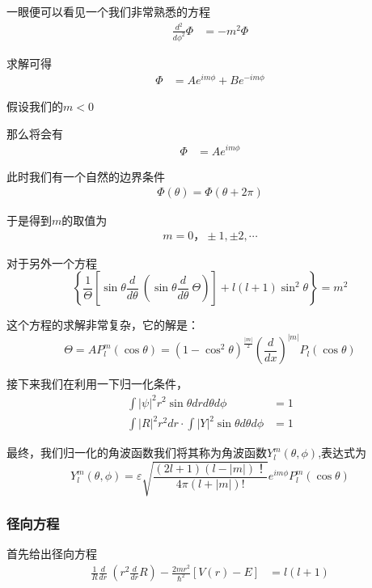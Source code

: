 \documentclass{article}
\newcommand{\D}[2]{\frac{d}{d#2}#1}
\begin{document}
一眼便可以看见一个我们非常熟悉的方程
\begin{align*}
    \frac{d^2}{d\phi^2}\Phi&=-m^2\Phi
\end{align*}

求解可得
\begin{align*}
    \Phi&=Ae^{im\phi}+Be^{-im\phi}
\end{align*}

假设我们的$m<0$

那么将会有
\begin{align*}
    \Phi&=Ae^{im\phi}
\end{align*}

此时我们有一个自然的边界条件
\begin{align*}
    \Phi(\theta)=\Phi(\theta+2\pi)
\end{align*}

于是得到$m$的取值为
\begin{align*}
    m=0，\pm 1,\pm 2,\cdots
\end{align*}

对于另外一个方程
\begin{equation*}
    \left\{\frac{1}{\Theta}\left[\sin{\theta}\D{~}{\theta}\left(\sin{\theta}\D{~}{\theta}\Theta\right)\right]+l(l+1)\sin^2{\theta}\right\}=m^2
\end{equation*}

这个方程的求解非常复杂，它的解是：
\begin{equation*}
    \Theta=AP_l^m(\cos{\theta})=(1-\cos^2{\theta})^{\frac{|m|}{2}}\left(\frac{d}{dx}\right)^{|m|}P_l(\cos{\theta})
\end{equation*}

接下来我们在利用一下归一化条件，
\begin{align*}
    \int|\psi|^2r^2\sin{\theta}drd\theta d\phi&=1\\
    \int|R|^2r^2dr\cdot\int|Y|^2\sin{\theta}d\theta d\phi&=1
\end{align*}

最终，我们归一化的角波函数我们将其称为角波函数$Y_l^m(\theta,\phi)$,表达式为
\begin{equation*}
    Y_l^m(\theta,\phi)=\varepsilon\sqrt{\frac{(2l+1)(l-|m|)！}{4\pi(l+|m|)!}}e^{im\phi}P_l^m(\cos{\theta})
\end{equation*}

\subsubsection{径向方程}
首先给出径向方程
\begin{align*}
    \frac{1}{R}\D{~}{r}\left(r^2\D{R}{r}\right)-\frac{2mr^2}{\hbar^2}\left[V(r)-E\right]&=l(l+1)
\end{align*}
\end{document}

